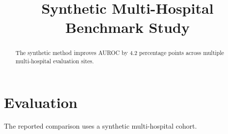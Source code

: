 \documentclass{article}
\title{Synthetic Multi-Hospital Benchmark Study}
\begin{document}
\maketitle
\begin{abstract}
The synthetic method improves AUROC by 4.2 percentage points across multiple
multi-hospital evaluation sites.
\end{abstract}
\section{Evaluation}
The reported comparison uses a synthetic multi-hospital cohort.
\end{document}
